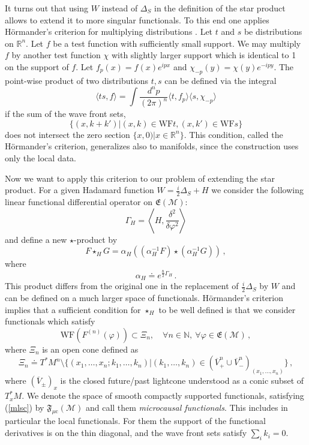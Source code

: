 \documentclass[11pt]{article}
\newcommand{\E}{\mathfrak{E}}
\newcommand{\F}{\mathfrak{F}}
\newcommand{\Mcal}{\mathcal{M}}
\newcommand{\WF}{\mathrm{WF}}         %
\newcommand{\mc}{{\mu\mathrm{c}}}
\newcommand{\NN}{\mathbb{N}}          %
\newcommand{\al}{\alpha}
\newcommand{\ph}{\varphi}
\newcommand{\1}{\mathds{1}}                         %
\newcommand{\be}{\begin{equation}}
\newcommand{\ee}{\end{equation}}
\begin{document}
{{It turns out that using $W$ instead of $\Delta_S$ in the definition of the star product allows to extend it to more singular functionals. To this end one applies H{\"o}rmander's criterion for multiplying distributions \cite{Hoer1}. Let $t$ and $s$ be distributions on $\mathbb R^n$. Let $f$ be a test function with sufficiently small support. We may multiply $f$ by another test function $\chi$ with slightly larger support which is identical to 1 on the support of $f$. Let $f_p(x)=f(x)e^{ipx}$ and $\chi_{-p}(y)=\chi(y)e^{-ipy}$.
The point-wise product of two distributions $t,s$ can be defined via the integral
\[\langle ts,f\rangle=\int \frac{d^np}{(2\pi)^n}\langle t,f_p\rangle\langle s,\chi_{-p}\rangle \] 
if the sum of the wave front sets,
{\[\{(x,k+k')|(x,k)\in\mathrm{WF}t,(x,k')\in\mathrm{WF}s\}\]}
{does not intersect the zero section $\{x,0)|x\in\mathbb R^n\}$.} This condition, called the  H{\"o}rmander's criterion, generalizes also to manifolds, since the construction uses only the local data.

Now we want to apply this criterion to our problem of extending the star product. For a given Hadamard function $W=\frac{i}{2}\Delta_S+H$ we consider the following linear functional differential operator on $\E(\Mcal)$:
\be
\Gamma_H=\left\langle H,\frac{\delta^2}{\delta\ph^2}\right\rangle
\ee
and define a new $\star$-product by
\be\label{Hprod}
F\star_HG=\al_H\left((\al^{-1}_HF)\star(\al_H^{-1}G)\right)\,, 
 \ee
 where 
 \[
 \al_H\doteq e^{\frac{\hbar}{2}\Gamma_H}\,.
 \]
 This product differs from the original one in the replacement of $\frac{i}{2}\Delta_S$ by $W$ and can be defined on a much larger space of functionals. H{\"o}rmander's criterion implies that a sufficient condition for $\star_H$ to be well defined is that we consider functionals which satisfy
 \be\label{mlsc}
\WF(F^{(n)}(\ph))\subset \Xi_n,\quad\forall n\in\NN,\ \forall\ph\in\E(\Mcal)\,,
\ee
where $\Xi_n$ is an open cone defined as 
\be\label{cone}
\Xi_n\doteq T^*M^n\setminus\{(x_1,\dots,x_n;k_1,\dots,k_n)| (k_1,\dots,k_n)\in (\overline{V}_+^n \cup \overline{V}_-^n)_{(x_1,\dots,x_n)}\}\,,
\ee
where $(\overline{V}_{\pm})_x$ is the closed future/past lightcone understood as a conic subset of
$T^*_xM$. We denote the space of smooth compactly supported functionals, satisfying (\ref{mlsc}) by $\F_\mc(\Mcal)$ and call them \textit{microcausal functionals}. This includes in particular the local functionals. For them the support of the functional derivatives is on the thin diagonal, and the wave front sets satisfy $\sum_i k_i=0$. 
 
}}
\end{document}
